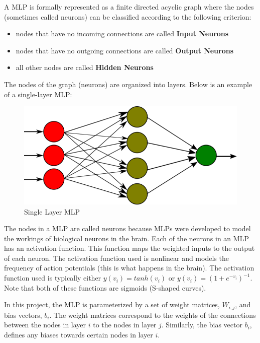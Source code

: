 \documentclass[12pt, titlepage]{article}
\begin{document}
  A MLP is formally represented as a finite directed acyclic graph where the nodes (sometimes called neurons) can be
  classified according to the following criterion:
  \begin{itemize}
    \item nodes that have no incoming connections are called \textbf{Input Neurons}
    \item nodes that have no outgoing connections are called \textbf{Output Neurons}
    \item all other nodes are called \textbf{Hidden Neurons}
  \end{itemize}
  The nodes of the graph (neurons) are organized into layers. Below is an example of a single-layer MLP:
  \FloatBarrier
  \begin{figure}[h]
    \caption{Single Layer MLP}
    \centering
    \includegraphics[scale=0.3]{images/single_layer_mlp_example}
  \end{figure}
  \FloatBarrier
  
  The nodes in a MLP are called neurons because MLPs were developed to model the workings of biological neurons in the
  brain. Each of the neurons in an MLP has an activation function. This function maps the weighted inputs to the output of
  each neuron. The activation function used is nonlinear and models the frequency of action potentials (this is what happens
  in the brain). The activation function used is typically either $y(v_{i}) = tanh(v_{i})$ or $y(v_{i}) = (1 + e^{-v_{i}})^{-1}$.
  Note that both of these functions are sigmoids (S-shaped curves).
  
  In this project, the MLP is parameterized by a set of weight matrices, $W_{i,j}$, and bias vectors, $b_{i}$. The weight
  matrices correspond to the weights of the connections between the nodes in layer $i$ to the nodes in layer $j$. Similarly,
  the bias vector $b_{i}$, defines any biases towards certain nodes in layer $i$.
  
\end{document}
